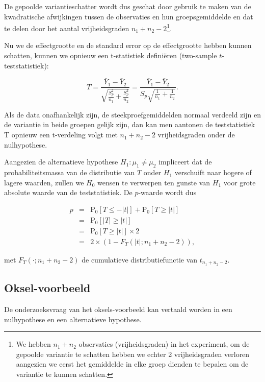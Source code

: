 \documentclass[
  12pt,dutch,coursenotes]{book}
\theoremstyle{definition}
\theoremstyle{definition}
\theoremstyle{definition}
\theoremstyle{definition}
\theoremstyle{remark}
\begin{document}
De gepoolde variantieschatter wordt dus geschat door gebruik te maken van de kwadratische afwijkingen tussen de observaties en hun groepsgemiddelde en dat te delen door het aantal vrijheidsgraden \(n_1+n_2-2\)\footnote{We hebben \(n_1+n_2\) observaties (vrijheidsgraden) in het experiment, om de gepoolde variantie te schatten hebben we echter 2 vrijheidsgraden verloren aangezien we eerst het gemiddelde in elke groep dienden te bepalen om de variantie te kunnen schatten.}.

Nu we de effectgrootte en de standard error op de effectgrootte hebben kunnen schatten, kunnen we opnieuw een t-statistiek definiëren (two-sample \(t\)-teststatistiek):

\[T = \frac{\bar{Y}_1-\bar{Y}_2}{\sqrt{\frac{S_p^2}{n_1}+\frac{S_p^2}{n_2}}} =
  \frac{\bar{Y}_1 - \bar{Y}_2}{S_p\sqrt{\frac{1}{n_1}+\frac{1}{n_2}}}.\]

Als de data onafhankelijk zijn, de steekproefgemiddelden normaal verdeeld zijn en de variantie in beide groepen gelijk zijn, dan kan men aantonen de teststatistiek T opnieuw een t-verdeling volgt met \(n_1+n_2-2\) vrijheidsgraden onder de nulhypothese.

Aangezien de alternatieve hypothese \(H_1: \mu_1 \neq \mu_2\) impliceert dat de probabiliteitsmassa van de distributie van \(T\) onder \(H_1\) verschuift naar hogere of lagere waarden, zullen we \(H_0\) wensen te verwerpen ten gunste van \(H_1\) voor grote absolute waarde van de teststatistiek. De \(p\)-waarde wordt dus

\begin{eqnarray*}
  p&=&\text{P}_0\left[T\leq -|t|\right] + \text{P}_0\left[T\geq |t|\right]\\
  &=&\text{P}_0\left[\vert T\vert \geq \vert t \vert\right]\\
  &=&\text{P}_0\left[T \geq \vert t \vert\right]\times 2\\
  &=& 2\times(1-F_T(\vert t\vert;n_1+n_2-2)),
\end{eqnarray*}

met \(F_T(\cdot;n_1+n_2-2)\) de cumulatieve distributiefunctie van \(t_{n_1+n_2-2}\).

\hypertarget{oksel-voorbeeld}{%
\subsection{Oksel-voorbeeld}\label{oksel-voorbeeld}}

De onderzoeksvraag van het oksels-voorbeeld kan vertaald worden in een nulhypothese en een alternatieve hypothese.
\end{document}
